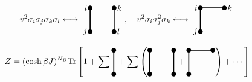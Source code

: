 \documentclass[a4paper,11pt]{jsreport}
\begin{document}
\begin{equation}
  v^2\sigma_i \sigma_j \sigma_k \sigma_l \longleftrightarrow
  \begin{tikzpicture}[baseline={([yshift=-.5ex]current bounding box.center)}]
    \draw[very thick](0,0)--(0,-1);
    \draw[very thick](1,0)--(1,-1);
    \fill(0,0)circle(0.1)node[left]{$i$};
    \fill(0,-1)circle(0.1)node[left]{$j$};
    \fill(1,0)circle(0.1)node[right]{$k$};
    \fill(1,-1)circle(0.1)node[right]{$l$};
  \end{tikzpicture}, \ \ \
  v^2\sigma_i \sigma_j^2 \sigma_k \longleftrightarrow
  \begin{tikzpicture}[baseline={([yshift=-.5ex]current bounding box.center)}]
    \draw[very thick](0,0)--(0,-1);
    \draw[very thick](0,0)--(1,0);
    \fill(0,0)circle(0.1)node[left]{$i$};
    \fill(0,-1)circle(0.1)node[left]{$j$};
    \fill(1,0)circle(0.1)node[right]{$k$};
  \end{tikzpicture}
\end{equation}

\begin{equation}
  Z = (\cosh{\beta J})^{N_B}\mathrm{Tr}
  \left[
    1 + \sum
    \begin{tikzpicture}[baseline={([yshift=-.5ex]current bounding box.center)}]
      \draw[very thick](0,0)--(0,-1);
      \fill(0,0)circle(0.1);
      \fill(0,-1)circle(0.1);
    \end{tikzpicture}
    + \sum
    \left(
    \begin{tikzpicture}[baseline={([yshift=-.5ex]current bounding box.center)}]
      \draw[very thick](0,0)--(0,-1);
      \draw[very thick](1,0)--(1,-1);
      \fill(0,0)circle(0.1);
      \fill(0,-1)circle(0.1);
      \fill(1,0)circle(0.1);
      \fill(1,-1)circle(0.1);
    \end{tikzpicture} +
    \begin{tikzpicture}[baseline={([yshift=-.5ex]current bounding box.center)}]
      \draw[very thick](0,0)--(0,-1);
      \draw[very thick](0,0)--(1,0);
      \fill(0,0)circle(0.1);
      \fill(0,-1)circle(0.1);
      \fill(1,0)circle(0.1);
    \end{tikzpicture}
    \right) + \cdots
    \right]
\end{equation}
\end{document}
